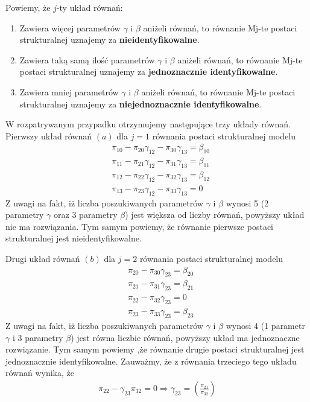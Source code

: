 Powiemy, że $ j $-ty układ równań:
\begin{enumerate}
	\item Zawiera więcej parametrów $ \gamma $ i $ \beta $ aniżeli równań, to równanie Mj-te postaci strukturalnej uznajemy za \textbf{nieidentyfikowalne}.
	\item Zawiera taką samą ilość parametrów $ \gamma $ i $ \beta $ aniżeli równań, to równanie Mj-te postaci strukturalnej uznajemy za \textbf{jednoznacznie identyfikowalne}.
	\item Zawiera mniej parametrów $ \gamma $ i $ \beta $ aniżeli równań, to równanie Mj-te postaci strukturalnej uznajemy za \textbf{niejednoznacznie identyfikowalne}.
\end{enumerate}

W rozpatrywanym przypadku otrzymujemy następujące trzy układy równań. Pierwszy układ równań $ (a) $ dla $ j=1 $ równania postaci strukturalnej modelu
\begin{align*}
	 & \pi _{10}-\pi _{20} \gamma _{12}-\pi _{30} \gamma _{13} =\beta_{10} \\
	 & \pi _{11}-\pi _{21} \gamma _{12}-\pi _{31} \gamma _{13} =\beta_{11} \\
	 & \pi _{12}-\pi _{22} \gamma _{12}-\pi _{32} \gamma _{13} =\beta_{12} \\
	 & \pi _{13}-\pi _{23} \gamma _{12}-\pi _{33} \gamma _{13} =0
\end{align*}
Z uwagi na fakt, iż liczba poszukiwanych parametrów $ \gamma $ i $ \beta $ wynosi 5 (2 parametry $ \gamma $ oraz 3 parametry $ \beta $) jest większa od liczby równań, powyższy układ nie ma rozwiązania. Tym samym powiemy, że równanie pierwsze postaci strukturalnej jest nieidentyfikowalne.

Drugi układ równań $ (b) $ dla $ j=2 $ równania postaci strukturalnej modelu
\begin{align*}
	 & \pi _{20}-\pi _{30} \gamma _{23} = \beta _{20} \\
	 & \pi _{21}-\pi _{31} \gamma _{23} = \beta _{21} \\
	 & \pi _{22}-\pi _{32} \gamma _{23} = 0           \\
	 & \pi _{23}-\pi _{33} \gamma _{23} = \beta _{23}
\end{align*}
Z uwagi na fakt, iż liczba poszukiwanych parametrów $ \gamma $ i $ \beta $ wynosi 4 (1 parametr $ \gamma $ i 3 parametry $ \beta $) jest równa liczbie równań, powyższy układ ma jednoznaczne rozwiązanie. Tym samym powiemy ,że równanie drugie postaci strukturalnej jest jednoznacznie identyfikowalne. Zauważmy, że z równania trzeciego tego układu równań wynika, że
\begin{gather*}
\pi_{22}-\gamma_{23}\pi_{32}=0\Rightarrow\gamma_{23}=\left(\frac{\pi_{21}}{\pi_{32}}\right)
\end{gather*}

